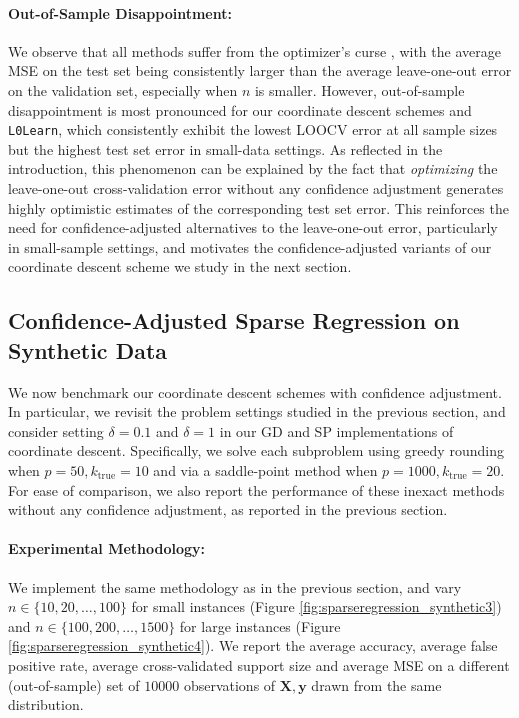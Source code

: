 \documentclass[opre,nonblindrev]{informs3} %
\begin{document}
\paragraph{Out-of-Sample Disappointment: } We observe that all methods suffer from the optimizer's curse \citep[c.f.][]{smith2006optimizer, van2021data}, with the average MSE on the test set being consistently larger than the average leave-one-out error on the validation set, especially when $n$ is smaller. However, out-of-sample disappointment is most pronounced for our coordinate descent schemes and \verb|L0Learn|, which consistently exhibit the lowest LOOCV error at all sample sizes but the highest test set error in small-data settings. As reflected in the introduction, this phenomenon can be explained by the fact that \textit{optimizing} the leave-one-out cross-validation error without any confidence adjustment generates highly optimistic estimates of the corresponding test set error. This reinforces the need for confidence-adjusted alternatives to the leave-one-out error, particularly in small-sample settings, and motivates the confidence-adjusted variants of our coordinate descent scheme we study in the next section.


\subsection{Confidence-Adjusted Sparse Regression on Synthetic Data}\label{sec:syntStats2}
We now benchmark our coordinate descent schemes with confidence adjustment. In particular, we revisit the problem settings studied in the previous section, and consider setting $\delta=0.1$ and $\delta=1$ in our GD and SP implementations of coordinate descent. Specifically, we solve each subproblem using greedy rounding when $p=50, k_{\text{true}}=10$ and via a saddle-point method when $p=1000, k_{\text{true}}=20$. For ease of comparison, we also report the performance of these inexact methods without any confidence adjustment, as reported in the previous section.

\paragraph{Experimental Methodology: } We implement the same methodology as in the previous section, and vary $n \in \{10, 20, \ldots, 100\}$ for small instances (Figure \ref{fig:sparseregression_synthetic3}) and $n \in \{100, 200, \ldots, 1500\}$ for large instances (Figure \ref{fig:sparseregression_synthetic4}). We report the average accuracy, average false positive rate, average cross-validated support size and average MSE on a different (out-of-sample) set of $10000$ observations of $\bm{X}, \bm{y}$ drawn from the same distribution.%
\end{document}
